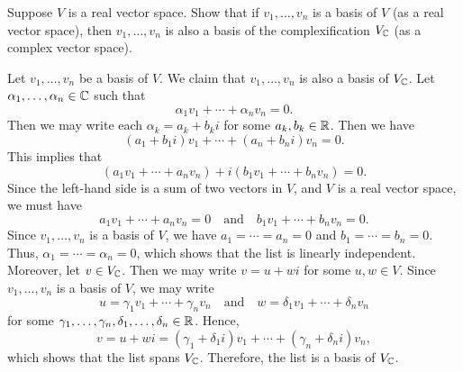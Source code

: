 \begin{exc}
\begin{exercise}
Suppose $V$ is a real vector space. Show that if $v_1,\dots,v_n$ is a basis of
$V$ (as a real vector space), then $v_1,\dots,v_n$ is also a basis of the
complexification $V_{\mathbb{C}}$ (as a complex vector space).
\end{exercise}
\begin{solution}
Let $v_1,\dots,v_n$ be a basis of $V$. We claim that $v_1,\dots,v_n$ is also a
basis of $V_{\mathbb{C}}$. Let $\alpha_1,\dots,\alpha_n\in\mathbb{C}$ such that
\[ \alpha_1v_1+\cdots+\alpha_nv_n = 0. \]
Then we may write each $\alpha_k=a_k+b_ki$ for some $a_k,b_k\in\mathbb{R}$. Then we have
\[ (a_1+b_1i)v_1+\cdots+(a_n+b_ni)v_n = 0. \]
This implies that
\[ (a_1v_1+\cdots+a_nv_n)+i(b_1v_1+\cdots+b_nv_n) = 0. \]
Since the left-hand side is a sum of two vectors in $V$, and $V$ is a real
vector space, we must have
\[ a_1v_1+\cdots+a_nv_n = 0 \quad\text{and}\quad b_1v_1+\cdots+b_nv_n = 0. \]
Since $v_1,\dots,v_n$ is a basis of $V$, we have $a_1=\cdots=a_n=0$ and
$b_1=\cdots=b_n=0$. Thus, $\alpha_1=\cdots=\alpha_n=0$, which shows that the
list is linearly independent. Moreover, let $v\in V_{\mathbb{C}}$. Then we may write
$v=u+wi$ for some $u,w\in V$. Since $v_1,\dots,v_n$ is a basis of $V$, we may
write
\[ u = \gamma_1v_1+\cdots+\gamma_nv_n \quad\text{and}\quad
   w = \delta_1v_1+\cdots+\delta_nv_n \]
for some $\gamma_1,\dots,\gamma_n,\delta_1,\dots,\delta_n\in\mathbb{R}$. Hence,
\[ v = u+wi = (\gamma_1+\delta_1i)v_1+\cdots+(\gamma_n+\delta_ni)v_n, \]
which shows that the list spans $V_{\mathbb{C}}$. Therefore, the list is a basis of
$V_{\mathbb{C}}$.
\end{solution}
\end{exc}

